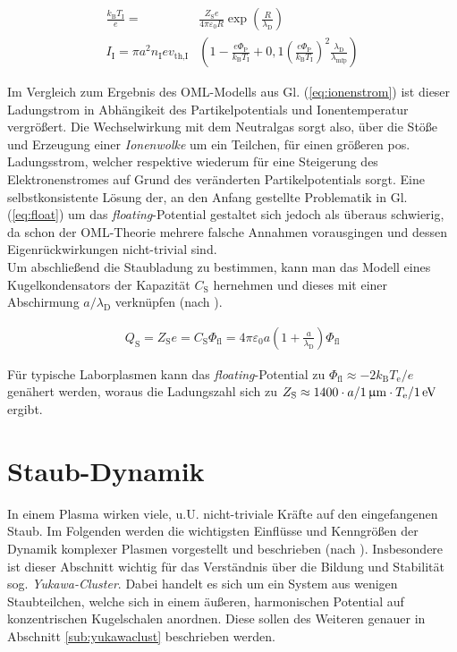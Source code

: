 \documentclass[numbers=noenddot,a4paper,notitlepage,twoside,BCOR15mm]{scrbook}
\newcommand{\ix}[1]{_\text{#1}}
\newcommand{\tilt}[1]{\textit{#1}}
\begin{document}
				\begin{align}
					\frac{k\ix{B}T\ix{I}}{e}=&\frac{Z\ix{S}e}{4\pi\varepsilon\ix{0}R}\exp\left(\frac{R}{\lambda\ix{D}}\right) \label{eq:bestimmR} \\
					I\ix{I}=\pi a^{2} n\ix{I}e v\ix{th,I}&\left(1-\frac{e\Phi\ix{P}}{k\ix{B}T\ix{I}}+0,1\left(\frac{e\Phi\ix{P}}{k\ix{B}T\ix{I}}\right)^{2}\frac{\lambda\ix{D}}{\lambda\ix{mfp}}\right) \label{eq:ionstromkorr}
				\end{align}

			Im Vergleich zum Ergebnis des OML-Modells aus Gl. (\ref{eq:ionenstrom}) ist dieser Ladungstrom in Abh\"angikeit des Partikelpotentials und Ionentemperatur vergr\"o{\ss}ert. Die Wechselwirkung mit dem Neutralgas sorgt also, \"uber die St\"o{\ss}e und Erzeugung einer \tilt{Ionenwolke} um ein Teilchen, f\"ur einen gr\"o{\ss}eren pos. Ladungsstrom, welcher respektive wiederum f\"ur eine Steigerung des Elektronenstromes auf Grund des ver\"anderten Partikelpotentials sorgt. Eine selbstkonsistente L\"osung der, an den Anfang gestellte Problematik in Gl. (\ref{eq:float}) um das \tilt{floating}-Potential gestaltet sich jedoch als \"uberaus schwierig, da schon der OML-Theorie mehrere falsche Annahmen vorausgingen und dessen Eigenr\"uckwirkungen nicht-trivial sind.\\
			Um abschließend die Staubladung zu bestimmen, kann man das Modell eines Kugelkondensators der Kapazität $C\ix{S}$ hernehmen und dieses mit einer Abschirmung $a/\lambda\ix{D}$ verknüpfen (nach \cite{Melzer12}).

				\begin{align}
					Q\ix{S}=Z\ix{S}e=C\ix{S}\Phi\ix{fl}=4\pi\varepsilon\ix{0}a\left(1+\frac{a}{\lambda\ix{D}}\right)\Phi\ix{fl} \label{eq:ladung}
				\end{align}

			Für typische Laborplasmen kann das \tilt{floating}-Potential zu $\Phi\ix{fl}\approx-2k\ix{B}T\ix{e}/e$ genähert werden, woraus die Ladungszahl sich zu $Z\ix{S}\approx1400\cdot a/\unit[1]{\upmu m}\cdot T\ix{e}/\unit[1]{eV}$ ergibt.

		\section{Staub-Dynamik}\label{sub:dynamik}

			In einem Plasma wirken viele, u.U. nicht-triviale Kräfte auf den eingefangenen Staub. Im Folgenden werden die wichtigsten Einflüsse und Kenngrößen der Dynamik komplexer Plasmen vorgestellt und beschrieben (nach \cite{Melzer10}). Insbesondere ist dieser Abschnitt wichtig für das Verständnis über die Bildung und Stabilität sog. \tilt{Yukawa-Cluster}. Dabei handelt es sich um ein System aus wenigen Staubteilchen, welche sich in einem äußeren, harmonischen Potential auf konzentrischen Kugelschalen anordnen. Diese sollen des Weiteren genauer in Abschnitt \ref{sub:yukawaclust} beschrieben werden.
\end{document}
